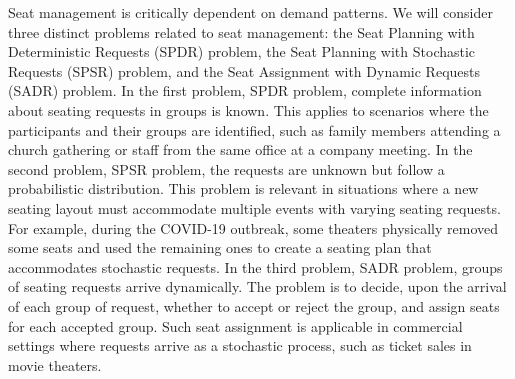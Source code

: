 Seat management is critically dependent on demand patterns. We will consider three distinct problems related to seat management: the Seat Planning with Deterministic Requests (SPDR) problem, the Seat Planning with Stochastic Requests (SPSR) problem, and the Seat Assignment with Dynamic Requests (SADR) problem. In the first problem, SPDR problem, complete information about seating requests in groups is known. This applies to scenarios where the participants and their groups are identified, such as family members attending a church gathering or staff from the same office at a company meeting. In the second problem, SPSR problem, the requests are unknown but follow a probabilistic distribution. This problem is relevant in situations where a new seating layout must accommodate multiple events with varying seating requests. For example, during the COVID-19 outbreak, some theaters physically removed some seats and used the remaining ones to create a seating plan that accommodates stochastic requests. In the third problem, SADR problem, groups of seating requests arrive dynamically. The problem is to decide, upon the arrival of each group of request, whether to accept or reject the group, and assign seats for each accepted group. Such seat assignment is applicable in commercial settings where requests arrive as a stochastic process, such as ticket sales in movie theaters.



 

